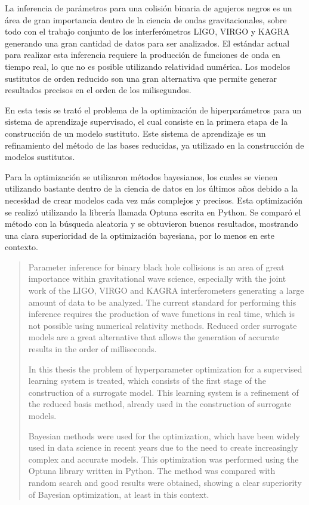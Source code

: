 \begin{resumen}%


La inferencia de parámetros para una colisión binaria de agujeros negros es un área de gran importancia dentro de la ciencia de ondas gravitacionales, sobre todo con el trabajo conjunto de los interferómetros LIGO, VIRGO y KAGRA generando una gran cantidad de datos para ser analizados. El estándar actual para realizar esta inferencia requiere la producción de funciones de onda en tiempo real, lo que no es posible utilizando relatividad numérica. Los modelos sustitutos de orden reducido son una gran alternativa que permite generar resultados precisos en el orden de los milisegundos.

En esta tesis se trató el problema de la optimización de hiperparámetros para un sistema de aprendizaje supervisado, el cual consiste en la primera etapa de la construcción de un modelo sustituto. Este sistema de aprendizaje es un refinamiento del método de las bases reducidas, ya utilizado en la construcción de modelos sustitutos. 

Para la optimización se utilizaron métodos bayesianos, los cuales se vienen utilizando bastante dentro de la ciencia de datos en los últimos años debido a la necesidad de crear modelos cada vez más complejos y precisos. Esta optimización se realizó utilizando la librería llamada Optuna escrita en Python. Se comparó el método con la búsqueda aleatoria y se obtuvieron buenos resultados, mostrando una clara superioridad de la optimización bayesiana, por lo menos en este contexto.


\end{resumen}

\begin{abstract}%
Parameter inference for binary black hole collisions is an area of great importance within gravitational wave science, especially with the joint work of the LIGO, VIRGO and KAGRA interferometers generating a large amount of data to be analyzed. The current standard for performing this inference requires the production of wave functions in real time, which is not possible using numerical relativity methods. Reduced order surrogate models are a great alternative that allows the generation of accurate results in the order of milliseconds.

In this thesis the problem of hyperparameter optimization for a supervised learning system is treated, which consists of the first stage of the construction of a surrogate model. This learning system is a refinement of the reduced basis method, already used in the construction of surrogate models. 

Bayesian methods were used for the optimization, which have been widely used in data science in recent years due to the need to create increasingly complex and accurate models. This optimization was performed using the Optuna library written in Python. The method was compared with random search and good results were obtained, showing a clear superiority of Bayesian optimization, at least in this context.

\end{abstract}


